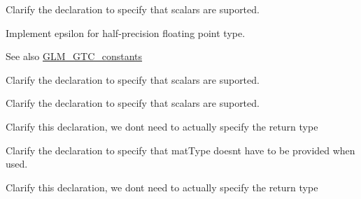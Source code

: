 
\begin{DoxyRefList}
\item[\label{todo__todo000003}%
\hypertarget{todo__todo000003}{}%
Member \hyperlink{group__core__func__integer_gaf5ecf64cbcb7f806a3c7915dd622209b}{glm\+:\+:bit\+Count} (gen\+I\+U\+Type$<$ T $>$ const \&Value)]Clarify the declaration to specify that scalars are suported.  
\item[\label{todo__todo000009}%
\hypertarget{todo__todo000009}{}%
Member \hyperlink{group__gtc__constants_gacb41049b8d22c8aa90e362b96c524feb}{glm\+:\+:epsilon} ()]Implement epsilon for half-\/precision floating point type. \begin{DoxySeeAlso}{See also}
\hyperlink{group__gtc__constants}{G\+L\+M\+\_\+\+G\+T\+C\+\_\+constants}  
\end{DoxySeeAlso}

\item[\label{todo__todo000004}%
\hypertarget{todo__todo000004}{}%
Member \hyperlink{group__core__func__integer_ga43d5d9ec05ba4c46035c764ad5fd3135}{glm\+:\+:find\+L\+S\+B} (gen\+I\+U\+Type$<$ T $>$ const \&Value)]Clarify the declaration to specify that scalars are suported.  
\item[\label{todo__todo000005}%
\hypertarget{todo__todo000005}{}%
Member \hyperlink{group__core__func__integer_gaee931af2eaecf61b629b33899c9d6f29}{glm\+:\+:find\+M\+S\+B} (gen\+I\+U\+Type$<$ T $>$ const \&Value)]Clarify the declaration to specify that scalars are suported.  
\item[\label{todo__todo000001}%
\hypertarget{todo__todo000001}{}%
Member \hyperlink{group__core__func__common_ga73320a13df979f16c13f9bbef0e42d8b}{glm\+:\+:int\+Bits\+To\+Float} (gen\+I\+Type const \&value)]Clarify this declaration, we don\textquotesingle{}t need to actually specify the return type  
\item[\label{todo__todo000006}%
\hypertarget{todo__todo000006}{}%
Member \hyperlink{group__core__func__matrix_ga15f67b26edfad8f08aa15048624d8b13}{glm\+:\+:outer\+Product} (vec\+Type const \&c, vec\+Type const \&r)]Clarify the declaration to specify that mat\+Type doesn\textquotesingle{}t have to be provided when used.  
\item[\label{todo__todo000002}%
\hypertarget{todo__todo000002}{}%
Member \hyperlink{group__core__func__common_gabeca18904d76b05d7541ff1ab02bad07}{glm\+:\+:uint\+Bits\+To\+Float} (gen\+U\+Type const \&value)]Clarify this declaration, we don\textquotesingle{}t need to actually specify the return type 
\end{DoxyRefList}